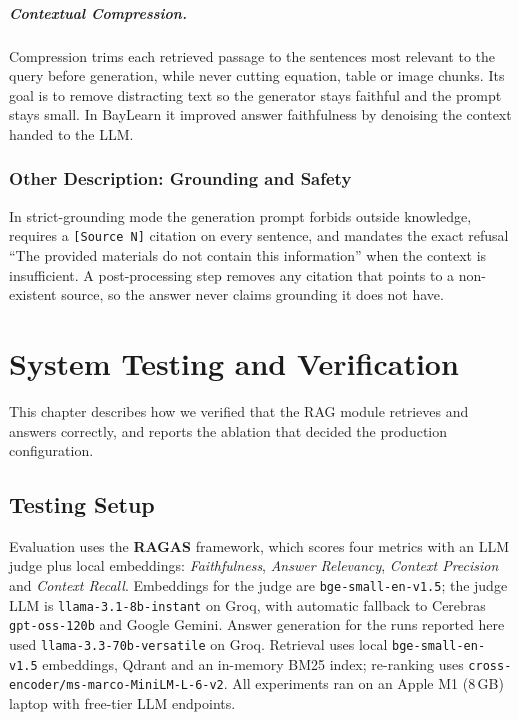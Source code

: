 \documentclass[12pt,a4paper]{report}
\begin{document}
\paragraph{Contextual Compression.}
Compression trims each retrieved passage to the sentences most relevant to the
query before generation, while never cutting equation, table or image chunks. Its
goal is to remove distracting text so the generator stays faithful and the prompt
stays small. In BayLearn it improved answer faithfulness by denoising the context
handed to the LLM.

\subsection{Other Description: Grounding and Safety}
In strict-grounding mode the generation prompt forbids outside knowledge, requires
a \texttt{[Source N]} citation on every sentence, and mandates the exact refusal
``The provided materials do not contain this information'' when the context is
insufficient. A post-processing step removes any citation that points to a
non-existent source, so the answer never claims grounding it does not have.

\chapter{System Testing and Verification}
This chapter describes how we verified that the RAG module retrieves and answers
correctly, and reports the ablation that decided the production configuration.

\section{Testing Setup}
Evaluation uses the \textbf{RAGAS} framework, which scores four metrics with an
LLM judge plus local embeddings: \emph{Faithfulness}, \emph{Answer Relevancy},
\emph{Context Precision} and \emph{Context Recall}. Embeddings for the judge are
\texttt{bge-small-en-v1.5}; the judge LLM is \texttt{llama-3.1-8b-instant} on
Groq, with automatic fallback to Cerebras \texttt{gpt-oss-120b} and Google Gemini.
Answer generation for the runs reported here used \texttt{llama-3.3-70b-versatile}
on Groq. Retrieval uses local \texttt{bge-small-en-v1.5} embeddings, Qdrant and an
in-memory BM25 index; re-ranking uses
\texttt{cross-encoder/ms-marco-MiniLM-L-6-v2}. All experiments ran on an Apple
M1 (8\,GB) laptop with free-tier LLM endpoints.
\end{document}
